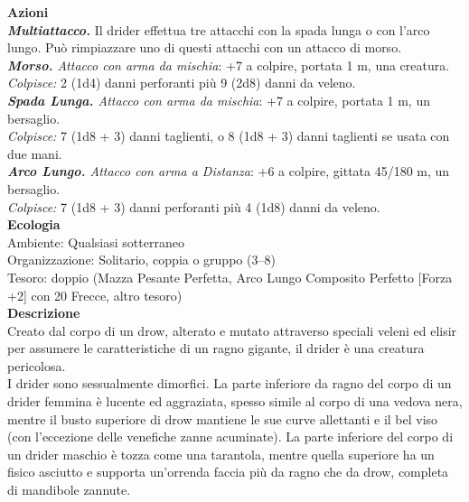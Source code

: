 \begin{multicols}{2}
\smallskip\textbf{Azioni}\\
\emph{\textbf{Multiattacco.}} Il drider effettua tre attacchi con la spada lunga o con l'arco lungo. Può rimpiazzare uno di questi attacchi con un attacco di morso.\\
\emph{\textbf{Morso.} Attacco con arma da mischia}: +7 a colpire, portata 1 m, una creatura.\\
\emph{Colpisce:} 2 (1d4) danni perforanti più 9 (2d8) danni da veleno.\\
\emph{\textbf{Spada Lunga.} Attacco con arma da mischia}: +7 a colpire, portata 1 m, un bersaglio.\\
\emph{Colpisce:} 7 (1d8 + 3) danni taglienti, o 8 (1d8 + 3) danni taglienti se usata con due mani.\\
\emph{\textbf{Arco Lungo.} Attacco con arma a Distanza}: +6 a colpire, gittata 45/180 m, un bersaglio.\\
\emph{Colpisce:} 7 (1d8 + 3) danni perforanti più 4 (1d8) danni da veleno.\\
\textbf{Ecologia}\\
Ambiente: Qualsiasi sotterraneo\\
Organizzazione: Solitario, coppia o gruppo (3–8)\\
Tesoro: doppio (Mazza Pesante Perfetta, Arco Lungo Composito Perfetto [Forza +2] con 20 Frecce, altro tesoro)\\
\textbf{Descrizione}\\
Creato dal corpo di un drow, alterato e mutato attraverso speciali veleni ed elisir per assumere le caratteristiche di un ragno gigante, il drider è una creatura pericolosa.\\
I drider sono sessualmente dimorfici. La parte inferiore da ragno del corpo di un drider femmina è lucente ed aggraziata, spesso simile al corpo di una vedova nera, mentre il busto superiore di drow mantiene le sue curve allettanti e il bel viso (con l’eccezione delle venefiche zanne acuminate). La parte inferiore del corpo di un drider maschio è tozza come una tarantola, mentre quella superiore ha un fisico asciutto e supporta un’orrenda faccia più da ragno che da drow, completa di mandibole zannute.\\


\end{multicols}
